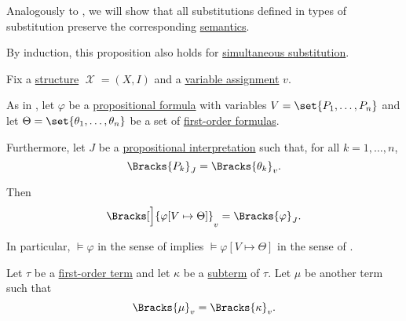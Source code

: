 \begin{proposition}\label{thm:first_order_substitution_equivalence}
  Analogously to , we will show that all substitutions defined in  types of substitution preserve the corresponding \hyperref[def:first_order_semantics]{semantics}.

  By induction, this proposition also holds for \hyperref[def:propositional_substitution]{simultaneous substitution}.

  Fix a \hyperref[def:first_order_structure]{structure} \( \mscrX = (X, I) \) and a \hyperref[def:first_order_valuation/variable_assignment]{variable assignment} \( v \).

  \begin{thmenum}
     As in , let \( \varphi \) be a \hyperref[def:propositional_syntax/formula]{propositional formula} with variables \( {V = \set{ P_1, \ldots, P_n }} \) and let \( \Theta = \set{ \theta_1, \ldots, \theta_n } \) be a set of \hyperref[def:first_order_syntax/formula]{first-order formulas}.

    Furthermore, let \( J \) be a \hyperref[def:propositional_valuation/interpretation]{propositional interpretation} such that, for all \( k = 1, \ldots, n \),
    \begin{equation}\label{eq:thm:first_order_substitution_equivalence/propositional/compatibility}
      \Bracks{P_k}_J = \Bracks{\theta_k}_v.
    \end{equation}

    Then
    \begin{equation}\label{eq:thm:first_order_substitution_equivalence/propositional}
      \Bracks[\Big]{ \varphi[V \mapsto \Theta] }_v = \Bracks{\varphi}_J.
    \end{equation}

    In particular, \( \vDash \varphi \) in the sense of  implies \( \vDash \varphi[V \mapsto \Theta] \) in the sense of .

     Let \( \tau \) be a \hyperref[def:first_order_syntax/term]{first-order term} and let \( \kappa \) be a \hyperref[def:first_order_syntax/subterm]{subterm} of \( \tau \). Let \( \mu \) be another term such that
    \begin{equation}\label{eq:thm:first_order_substitution_equivalence/term_in_term/compatibility}
      \Bracks{\mu}_v = \Bracks{\kappa}_v.
    \end{equation}


\end{thmenum}
\end{proposition}
